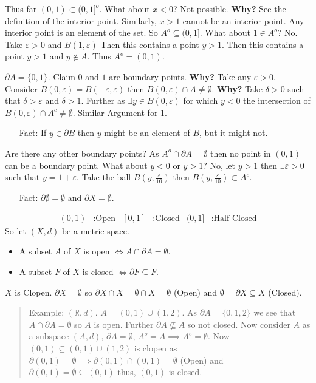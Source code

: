 \documentclass[10pt]{article}
\begin{document}
Thus far $(0,1)\subset(0,1]^{o}$. What about $x<0$? Not possible. \textbf{Why?} See the definition of the interior point. Similarly, $x>1$ cannot be an interior point. Any interior point is an element of the set. So $A^{o}\subseteq(0,1]$. What about $1\in A^{o}$? No. Take $\varepsilon>0$ and $B(1,\varepsilon)$ Then  this contains a point $y>1$. Then this contains a point $y>1$ and $y\notin A$. Thus $A^{o}=(0,1)$. 

$\partial A=\{0,1\}$. Claim $0$ and $1$ are boundary points. \textbf{Why?} Take any $\varepsilon>0$. Consider $B(0,\varepsilon)=B(-\varepsilon,\varepsilon)$ then $B(0,\varepsilon)\cap A\neq\emptyset$. \textbf{Why?} Take $\delta>0$ such that $\delta>\varepsilon$ and $\delta>1$. Further as $\exists y\in B(0,\varepsilon)$ for which $y<0$ the intersection of $B(0,\varepsilon)\cap A^{c}\neq\emptyset$. Similar Argument for 1. 
\begin{itemize}
    \item[Fact:] If $y\in\partial B$ then $y$ might be an element of $B$, but it might not. 
\end{itemize}
Are there any other boundary points? As $A^{o}\cap\partial A=\emptyset$ then no point in $(0,1)$ can be a boundary point. What about $y<0$ or $y>1$? No, let $y>1$ then $\exists\varepsilon>0$ such that $y=1+\varepsilon$. Take the ball $B(y,\frac{\varepsilon}{10})$ then $B(y,\frac{\varepsilon}{10})\subset A^{c}$. 
\begin{itemize}
    \item[Fact:] $\partial\emptyset=\emptyset$ and $\partial X=\emptyset$.
\end{itemize}
\begin{align*}
    (0,1)&:\text{Open} & [0,1]&:\text{Closed} & (0,1]&:\text{Half-Closed}
\end{align*}
So let $(X,d)$ be a metric space.
\begin{itemize}
    \item A subset $A$ of $X$ is open $\iff A\cap\partial A=\emptyset$.
    \item A subset $F$ of $X$ is closed $\iff\partial F\subseteq F$. 
\end{itemize}
$X$ is Clopen. $\partial X=\emptyset$ so $\partial X\cap X=\emptyset\cap X=\emptyset$ (Open) and $\emptyset=\partial X\subseteq X$ (Closed).
\begin{quote}
    Example: $(\mathbb{R},d)$. $A=(0,1)\cup(1,2)$. As $\partial A=\{0,1,2\}$ we see that $A\cap\partial A=\emptyset$ so $A$ is open. Further $\partial A\nsubseteq A$ so not closed. Now consider $A$ as a subspace $(A,d)$, $\partial A=\emptyset$, $A^{o}=A\implies A^{e}=\emptyset$. Now $(0,1)\subseteq(0,1)\cup(1,2)$ is clopen as $\partial(0,1)=\emptyset\implies\partial(0,1)\cap(0,1)=\emptyset$ (Open) and $\partial(0,1)=\emptyset\subseteq(0,1)$ thus, $(0,1)$ is closed. 
\end{quote}
\end{document}
